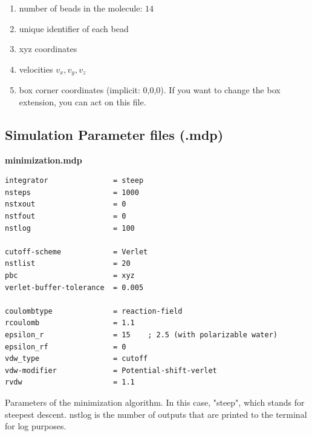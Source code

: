 \begin{enumerate}
    \item number of beads in the molecule: $14$
    \item unique identifier of each bead
    \item xyz coordinates
    \item velocities $v_x, v_y, v_z$
    \item box corner coordinates (implicit: 0,0,0). If you want to change the box extension, you can act on this file. 
\end{enumerate}


\subsection{Simulation Parameter files (.mdp)}
\begin{vlinesbox}
\fontsize{8pt}{7pt}\selectfont
\textbf{minimization.mdp}
\begin{verbatim}
integrator               = steep
nsteps                   = 1000
nstxout                  = 0
nstfout                  = 0
nstlog                   = 100

cutoff-scheme            = Verlet
nstlist                  = 20
pbc                      = xyz
verlet-buffer-tolerance  = 0.005

coulombtype              = reaction-field
rcoulomb                 = 1.1
epsilon_r                = 15    ; 2.5 (with polarizable water)
epsilon_rf               = 0
vdw_type                 = cutoff
vdw-modifier             = Potential-shift-verlet
rvdw                     = 1.1
\end{verbatim}
\end{vlinesbox}
Parameters of the minimization algorithm. In this case, "steep", which stands for steepest descent. nstlog is the number
of outputs that are printed to the terminal for log purposes. 





